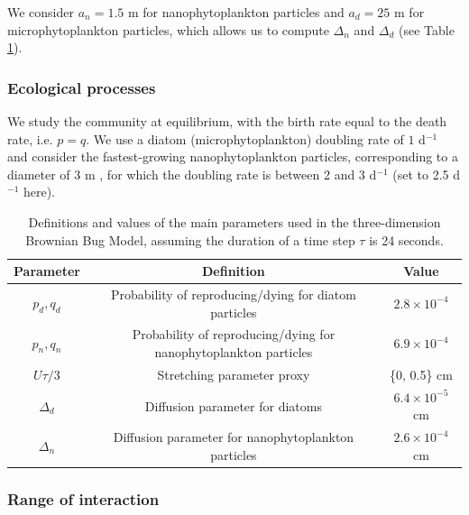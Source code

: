 \documentclass[english]{article}
\providecommand{\tabularnewline}{\\}
\begin{document}
We consider $a_{n}=1.5$ \textmu m for nanophytoplankton particles
and $a_{d}=25$ \textmu m for microphytoplankton particles, which
allows us to compute $\Delta_{n}$ and $\Delta_{d}$ (see Table \ref{tab:Definition-and-value}).

\subsubsection*{Ecological processes}

We study the community at equilibrium, with the birth rate equal to
the death rate, i.e. $p=q$. We use a diatom (microphytoplankton)
doubling rate of $1$ d$^{-1}$ \citep{bissinger_predicting_2008}
and consider the fastest-growing nanophytoplankton particles, corresponding
to a diameter of 3 \textmu m \citep{bec_growth_2008}, for which
the doubling rate is between 2 and 3 d$^{-1}$ (set to 2.5 d$^{-1}$
here).

\begin{table}[H]
\begin{centering}
\begin{tabular}{|c|c|c|}
\hline 
Parameter & Definition & Value\tabularnewline
\hline 
$p_{d},q_{d}$ & Probability of reproducing/dying for diatom particles & $2.8\times10^{-4}$\tabularnewline
$p_{n},q_{n}$ & Probability of reproducing/dying for nanophytoplankton particles & $6.9\times10^{-4}$\tabularnewline
$U\tau/3$ & Stretching parameter proxy & \{0, 0.5\} cm\tabularnewline
$\Delta_{d}$ & Diffusion parameter for diatoms & $6.4\times10^{-5}$ cm\tabularnewline
$\Delta_{n}$ & Diffusion parameter for nanophytoplankton particles & $2.6\times10^{-4}$ cm\tabularnewline
\hline 
\end{tabular}
\par\end{centering}
\caption{Definitions and values of the main parameters used in the three-dimension
Brownian Bug Model, assuming the duration of a time step $\tau$ is
24 seconds. \label{tab:Definition-and-value}}
\end{table}


\subsubsection*{Range of interaction}
\end{document}
